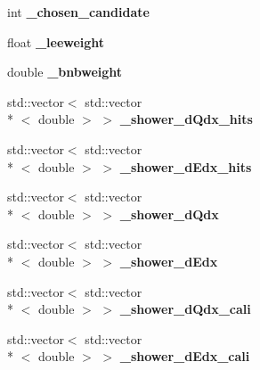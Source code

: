 \begin{DoxyCompactItemize}
\item 
\hypertarget{group__lee_ga258cdf1c3fb847abc6f3aad95f8471d0}{int {\bfseries \-\_\-chosen\-\_\-candidate}}\label{group__lee_ga258cdf1c3fb847abc6f3aad95f8471d0}

\item 
\hypertarget{group__lee_gaeba6b9ecae9a1616394a17189dfe4808}{float {\bfseries \-\_\-leeweight}}\label{group__lee_gaeba6b9ecae9a1616394a17189dfe4808}

\item 
\hypertarget{group__lee_ga9450f1c2fbd4efa3927094f9953c5041}{double {\bfseries \-\_\-bnbweight}}\label{group__lee_ga9450f1c2fbd4efa3927094f9953c5041}

\item 
\hypertarget{group__lee_gaa6b9f1a06dcc4c9b5e7ad66b2a5f3995}{std\-::vector$<$ std\-::vector\\*
$<$ double $>$ $>$ {\bfseries \-\_\-shower\-\_\-d\-Qdx\-\_\-hits}}\label{group__lee_gaa6b9f1a06dcc4c9b5e7ad66b2a5f3995}

\item 
\hypertarget{group__lee_ga8dc5bf5791d750d7481aa6a4051433d3}{std\-::vector$<$ std\-::vector\\*
$<$ double $>$ $>$ {\bfseries \-\_\-shower\-\_\-d\-Edx\-\_\-hits}}\label{group__lee_ga8dc5bf5791d750d7481aa6a4051433d3}

\item 
\hypertarget{group__lee_gaec600c2d05138143cbef4f23c44d92cf}{std\-::vector$<$ std\-::vector\\*
$<$ double $>$ $>$ {\bfseries \-\_\-shower\-\_\-d\-Qdx}}\label{group__lee_gaec600c2d05138143cbef4f23c44d92cf}

\item 
\hypertarget{group__lee_gab709b5ce1a5b80131bd14a57c2e82bf5}{std\-::vector$<$ std\-::vector\\*
$<$ double $>$ $>$ {\bfseries \-\_\-shower\-\_\-d\-Edx}}\label{group__lee_gab709b5ce1a5b80131bd14a57c2e82bf5}

\item 
\hypertarget{group__lee_gaaf81a95a1829c0041e9770be3d09f240}{std\-::vector$<$ std\-::vector\\*
$<$ double $>$ $>$ {\bfseries \-\_\-shower\-\_\-d\-Qdx\-\_\-cali}}\label{group__lee_gaaf81a95a1829c0041e9770be3d09f240}

\item 
\hypertarget{group__lee_gac413e11bfcca3b51ee4ab36ad94e68ba}{std\-::vector$<$ std\-::vector\\*
$<$ double $>$ $>$ {\bfseries \-\_\-shower\-\_\-d\-Edx\-\_\-cali}}\label{group__lee_gac413e11bfcca3b51ee4ab36ad94e68ba}


\end{DoxyCompactItemize}
